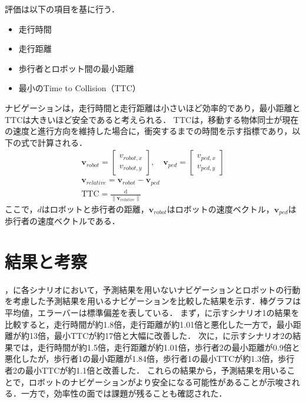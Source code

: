 \newpage

評価は以下の項目を基に行う．
\begin{itemize}
  \item 走行時間
  \item 走行距離
  \item 歩行者とロボット間の最小距離
  \item 最小のTime to Collision（TTC）
\end{itemize}
ナビゲーションは，走行時間と走行距離は小さいほど効率的であり，最小距離とTTCは大きいほど安全であると考えられる．
TTCは，移動する物体同士が現在の速度と進行方向を維持した場合に，衝突するまでの時間を示す指標であり，以下の式で計算される．
\setlength{\jot}{1em}
\begin{align}
  \mathbf{v}_{robot} = \begin{bmatrix} v_{robot,x} \\ v_{robot,y} \end{bmatrix}, \quad 
  \mathbf{v}_{ped} = \begin{bmatrix} v_{ped,x} \\ v_{ped,y} \end{bmatrix} \\
  \mathbf{v}_{relative} = \mathbf{v}_{robot} - \mathbf{v}_{ped} \\
  \text{TTC} = \frac{\text{d}}{\|\mathbf{v}_{relative}\|}
\end{align}
ここで，$d$はロボットと歩行者の距離，$\mathbf{v}_{robot}$はロボットの速度ベクトル，$\mathbf{v}_{ped}$は歩行者の速度ベクトルである．

\section{結果と考察}
，に各シナリオにおいて，予測結果を用いないナビゲーションとロボットの行動を考慮した予測結果を用いるナビゲーションを比較した結果を示す．棒グラフは平均値，エラーバーは標準偏差を表している．
まず，に示すシナリオ1の結果を比較すると，走行時間が約1.8倍，走行距離が約1.01倍と悪化した一方で，最小距離が約13倍，最小TTCが約17倍と大幅に改善した．
次に，に示すシナリオ2の結果では，走行時間が約1.5倍，走行距離が約1.01倍，歩行者2の最小距離が0.9倍と悪化したが，歩行者1の最小距離が1.84倍，歩行者1の最小TTCが約1.3倍，歩行者2の最小TTCが約1.1倍と改善した．
これらの結果から，予測結果を用いることで，ロボットのナビゲーションがより安全になる可能性があることが示唆される．一方で，効率性の面では課題が残ることも確認された．

